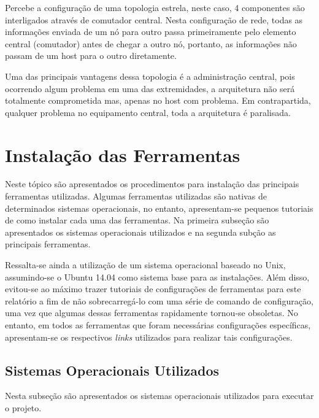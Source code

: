 		Percebe a configuração de uma topologia estrela, neste caso, 4 componentes são interligados através de comutador central. Nesta configuração de rede, todas as informações enviada de um nó para outro passa primeiramente pelo elemento central (comutador) antes de chegar a outro nó, portanto, as informações não passam de um host para o outro diretamente. \cite{Tanenbaum}

		Uma das principais vantagens dessa topologia é a administração central, pois ocorrendo algum problema em uma das extremidades, a arquitetura não será totalmente comprometida mas, apenas no host com problema. Em contrapartida, qualquer problema no equipamento central, toda a arquitetura é paralisada.

	\section{Instalação das Ferramentas}
	\label{sec:Arquitetura_Componentes}

		Neste tópico são apresentados os procedimentos para instalação das principais ferramentas utilizadas. Algumas ferramentas utilizadas são nativas de determinados sistemas operacionais, no entanto, apresentam-se pequenos tutoriais de como instalar cada uma das ferramentas. Na primeira subseção são apresentados os sistemas operacionais utilizados e na segunda subção as principais ferramentas.

		Ressalta-se ainda a utilização de um sistema operacional baseado no Unix, assumindo-se o Ubuntu 14.04 como sistema base para as instalações. Além disso, evitou-se ao máximo trazer tutoriais de configurações de ferramentas para este relatório a fim de não sobrecarregá-lo com uma série de comando de configuração, uma vez que algumas dessas ferramentas rapidamente tornou-se obsoletas. No entanto, em todos as ferramentas que foram necessárias configurações específicas, apresentam-se os respectivos \emph{links} utilizados para realizar tais configurações.

		\subsection{Sistemas Operacionais Utilizados}
		\label{sec:Arquitetura_Componentes_SOU}

			Nesta subseção são apresentados os sistemas operacionais utilizados para executar o projeto.


